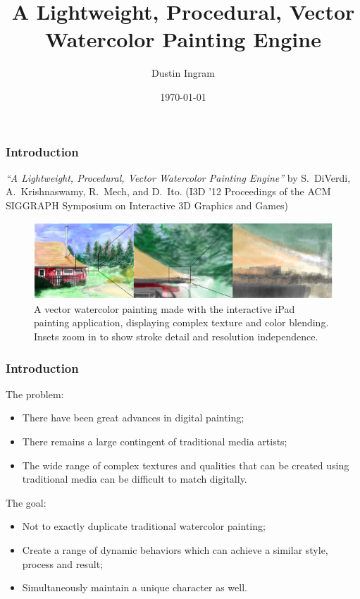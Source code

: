 \documentclass{beamer}
\title{A Lightweight, Procedural, Vector Watercolor Painting Engine}
\author{Dustin Ingram}
\institute{Interactive Computer Graphics, Spring 12-13\\ Drexel University
Department of Computer Science}
\date{\today}
\begin{document}
\maketitle

\begin{frame}
    \frametitle{Introduction}
    \emph{``A Lightweight, Procedural, Vector Watercolor Painting Engine''} by
    S.~DiVerdi, A.~Krishnaswamy, R.~Mech, and D.~Ito.
    (I3D '12 Proceedings of the ACM SIGGRAPH Symposium on Interactive 3D
    Graphics and Games)
    \begin{figure}
        \centering
        \includegraphics[width=0.8\paperwidth]{f1.png}
        \caption{\footnotesize{A vector watercolor painting made with the
        interactive iPad painting application, displaying complex texture and
        color blending.  Insets zoom in to show stroke detail and resolution
        independence.}}
    \end{figure}
\end{frame}

\begin{frame}
    \frametitle{Introduction}
    The problem:
    \begin{itemize}
        \item There have been great advances in digital painting;
        \item There remains a large contingent of traditional media artists;
        \item The wide range of complex textures and qualities that can be
        created using traditional media can be difficult to match digitally.
    \end{itemize}
    The goal:
    \begin{itemize}
        \item Not to exactly duplicate traditional watercolor painting;
        \item Create a range of dynamic behaviors which can achieve a similar
        style, process and result;
        \item Simultaneously maintain a unique character as well.
    \end{itemize}
\end{frame}
\end{document}
